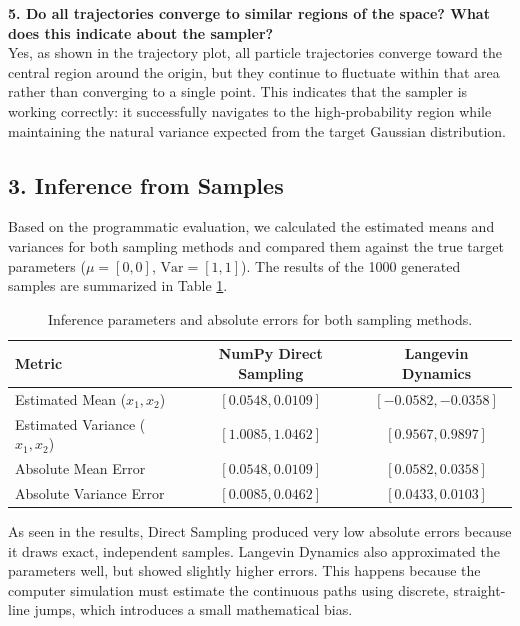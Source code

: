 \documentclass[a4paper,12pt]{extarticle}
\begin{document}
\vspace{0.3cm}
\textbf{5. Do all trajectories converge to similar regions of the space? What does this indicate about the sampler?} \\
Yes, as shown in the trajectory plot, all particle trajectories converge toward the central region around the origin, but they continue to fluctuate within that area rather than converging to a single point. This indicates that the sampler is working correctly: it successfully navigates to the high-probability region while maintaining the natural variance expected from the target Gaussian distribution.

\subsection{3. Inference from Samples}

Based on the programmatic evaluation, we calculated the estimated means and variances for both sampling methods and compared them against the true target parameters ($\mu = [0, 0]$, $\text{Var} = [1, 1]$). The results of the 1000 generated samples are summarized in Table \ref{tab:inference}.

\begin{table}[H]
    \centering
    \renewcommand{\arraystretch}{1.3}
    \begin{tabular}{|l|c|c|}
        \hline
        \textbf{Metric} & \textbf{NumPy Direct Sampling} & \textbf{Langevin Dynamics} \\
        \hline
        Estimated Mean ($x_1, x_2$) & $[0.0548, 0.0109]$ & $[-0.0582, -0.0358]$ \\
        Estimated Variance ($x_1, x_2$) & $[1.0085, 1.0462]$ & $[0.9567, 0.9897]$ \\
        Absolute Mean Error & $[0.0548, 0.0109]$ & $[0.0582, 0.0358]$ \\
        Absolute Variance Error & $[0.0085, 0.0462]$ & $[0.0433, 0.0103]$ \\
        \hline
    \end{tabular}
    \caption{Inference parameters and absolute errors for both sampling methods.}
    \label{tab:inference}
\end{table}

As seen in the results, Direct Sampling produced very low absolute errors because it draws exact, independent samples. Langevin Dynamics also approximated the parameters well, but showed slightly higher errors. This happens because the computer simulation must estimate the continuous paths using discrete, straight-line jumps, which introduces a small mathematical bias.
\end{document}
